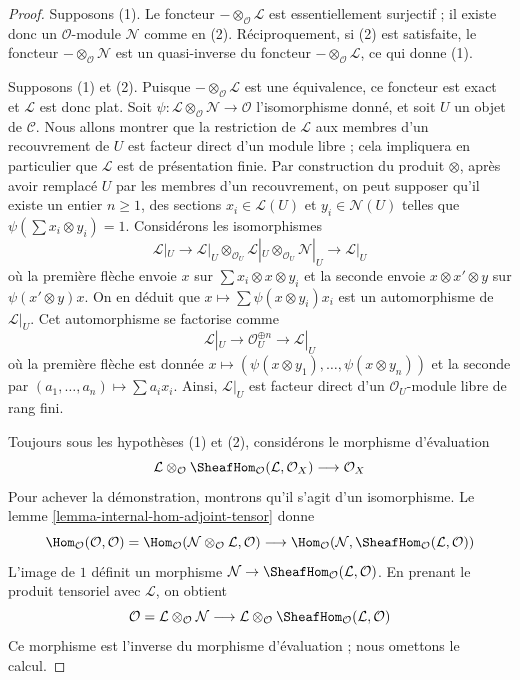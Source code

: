 \begin{proof}
Supposons (1). Le foncteur $- \otimes_\mathcal{O} \mathcal{L}$ est
essentiellement surjectif ; il existe donc un $\mathcal{O}$-module
$\mathcal{N}$ comme en (2). Réciproquement, si (2) est satisfaite, le
foncteur $- \otimes_\mathcal{O} \mathcal{N}$ est un quasi-inverse du
foncteur $- \otimes_\mathcal{O} \mathcal{L}$, ce qui donne (1).

\medskip\noindent

Supposons (1) et (2). Puisque $- \otimes_\mathcal{O} \mathcal{L}$ est une
équivalence, ce foncteur est exact et $\mathcal{L}$ est donc plat. Soit
$\psi : \mathcal{L} \otimes_\mathcal{O} \mathcal{N} \to \mathcal{O}$
l'isomorphisme donné, et soit $U$ un objet de $\mathcal{C}$. Nous allons
montrer que la restriction de $\mathcal{L}$ aux membres d'un recouvrement de
$U$ est facteur direct d'un module libre ; cela impliquera en
particulier que $\mathcal{L}$ est de présentation finie. Par construction
du produit $\otimes$, après avoir
remplacé $U$ par les membres d'un recouvrement, on peut supposer qu'il
existe un entier $n \geq 1$, des sections $x_i \in \mathcal{L}(U)$ et
$y_i \in \mathcal{N}(U)$ telles que
$\psi(\sum x_i \otimes y_i) = 1$. Considérons les isomorphismes
$$
\mathcal{L}|_U \to
\mathcal{L}|_U \otimes_{\mathcal{O}_U}
\mathcal{L}|_U \otimes_{\mathcal{O}_U} \mathcal{N}|_U \to \mathcal{L}|_U
$$
où la première flèche envoie $x$ sur
$\sum x_i \otimes x \otimes y_i$ et la seconde envoie
$x \otimes x' \otimes y$ sur $\psi(x' \otimes y)x$. On en déduit que
$x \mapsto \sum \psi(x \otimes y_i)x_i$ est un automorphisme de
$\mathcal{L}|_U$. Cet automorphisme se factorise comme
$$
\mathcal{L}|_U \to \mathcal{O}_U^{\oplus n} \to \mathcal{L}|_U
$$
où la première flèche est donnée
$x \mapsto (\psi(x \otimes y_1), \ldots, \psi(x \otimes y_n))$
et la seconde par $(a_1, \ldots, a_n) \mapsto \sum a_i x_i$. Ainsi,
$\mathcal{L}|_U$ est facteur direct d'un $\mathcal{O}_U$-module libre de
rang fini.

\medskip\noindent

Toujours sous les hypothèses (1) et (2), considérons le morphisme
d'évaluation
$$
\mathcal{L} \otimes_\mathcal{O}
\SheafHom_\mathcal{O}(\mathcal{L}, \mathcal{O}_X)
\longrightarrow \mathcal{O}_X
$$
Pour achever la démonstration, montrons qu'il s'agit d'un isomorphisme. Le
lemme \ref{lemma-internal-hom-adjoint-tensor} donne
$$
\Hom_\mathcal{O}(\mathcal{O}, \mathcal{O}) =
\Hom_\mathcal{O}
(\mathcal{N} \otimes_\mathcal{O} \mathcal{L}, \mathcal{O})
\longrightarrow
\Hom_\mathcal{O}
(\mathcal{N}, \SheafHom_\mathcal{O}(\mathcal{L}, \mathcal{O}))
$$
L'image de $1$ définit un morphisme
$\mathcal{N} \to \SheafHom_\mathcal{O}(\mathcal{L}, \mathcal{O})$. En
prenant le produit tensoriel avec $\mathcal{L}$, on obtient
$$
\mathcal{O} = \mathcal{L} \otimes_\mathcal{O} \mathcal{N}
\longrightarrow
\mathcal{L} \otimes_\mathcal{O} \SheafHom_\mathcal{O}(\mathcal{L}, \mathcal{O})
$$
Ce morphisme est l'inverse du morphisme d'évaluation ; nous omettons le
calcul.

\end{proof}

